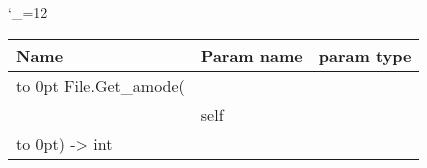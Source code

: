 \begingroup \catcode`\_=12 \tt
\begin{tabular}{lll}
\toprule
\textrm{Name}&\textrm{Param name}&\textrm{param type}\\
\midrule
\hbox to 0pt {File.Get_amode(\hss}\\
& self\\
\hbox to 0pt{) -> int\hss}\\
\bottomrule
\end{tabular}
\endgroup
